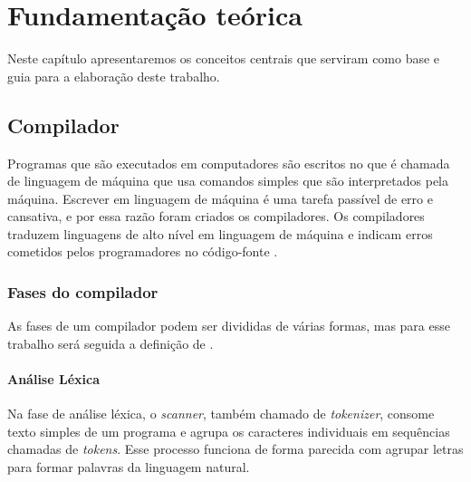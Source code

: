 \chapter{Fundamentação teórica}
\label{cap:fundamentacao-teorica}

Neste capítulo apresentaremos os conceitos centrais que serviram como base e guia para a elaboração deste trabalho.

\section{Compilador}
Programas que são executados em computadores são escritos no que é chamada de linguagem de máquina que usa comandos simples que são interpretados pela máquina. Escrever em linguagem de máquina é uma tarefa passível de erro e cansativa, e por essa razão foram criados os compiladores. Os compiladores traduzem linguagens de alto nível em linguagem de máquina e indicam erros cometidos pelos programadores no código-fonte \cite{mogensen2024introduction}.

\subsection{Fases do compilador}
As fases de um compilador podem ser divididas de várias formas, mas para esse trabalho será seguida a definição de \textcite{thain2020introduction}. 


\begin{figure}[ht]
    \captionsetup{width=16cm}
\end{figure}

\subsubsection{Análise Léxica}
Na fase de análise léxica, o \textit{scanner}, também chamado de \textit{tokenizer}, consome texto simples de um programa e agrupa os caracteres individuais em sequências chamadas de \textit{tokens}. Esse processo funciona de forma parecida com agrupar letras para formar palavras da linguagem natural.

